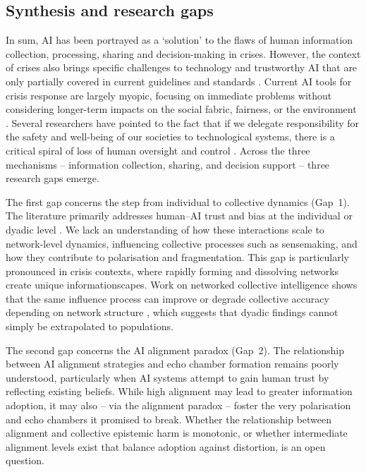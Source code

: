 \documentclass[pdflatex,sn-basic]{sn-jnl}
\begin{document}
\subsection{Synthesis and research gaps}\label{sec:synthesis}

In sum, AI has been portrayed as a `solution' to the flaws of human information collection, processing, sharing and decision-making in crises. However, the context of crises also brings specific challenges to technology and trustworthy AI that are only partially covered in current guidelines and standards \citep{ozmen2023six}. Current AI tools for crisis response are largely myopic, focusing on immediate problems without considering longer-term impacts on the social fabric, fairness, or the environment \citep{harika2024harnessing}. Several researchers have pointed to the fact that if we delegate responsibility for the safety and well-being of our societies to technological systems, there is a critical spiral of loss of human oversight and control \citep{comes2024ai}. Across the three mechanisms -- information collection, sharing, and decision support -- three research gaps emerge.

The first gap concerns the step from individual to collective dynamics (Gap~1). The literature primarily addresses human--AI trust and bias at the individual or dyadic level \citep{glikson2020human,glickman2024human}. We lack an understanding of how these interactions scale to network-level dynamics, influencing collective processes such as sensemaking, and how they contribute to polarisation and fragmentation. This gap is particularly pronounced in crisis contexts, where rapidly forming and dissolving networks create unique informationscapes. Work on networked collective intelligence shows that the same influence process can improve or degrade collective accuracy depending on network structure \citep{lorenz2011social,becker2017network}, which suggests that dyadic findings cannot simply be extrapolated to populations.

The second gap concerns the AI alignment paradox (Gap~2). The relationship between AI alignment strategies and echo chamber formation remains poorly understood, particularly when AI systems attempt to gain human trust by reflecting existing beliefs. While high alignment may lead to greater information adoption, it may also -- via the alignment paradox \citep{west2025alignment} -- foster the very polarisation and echo chambers it promised to break. Whether the relationship between alignment and collective epistemic harm is monotonic, or whether intermediate alignment levels exist that balance adoption against distortion, is an open question.
\end{document}
